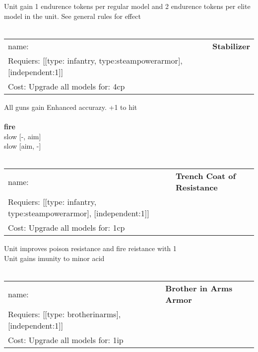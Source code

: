 Unit gain 1 endurence tokens per regular model  and 2 endurence tokens per elite model in the unit. See general rules for effect\\ 









\ \\
\begin{tabular}{ll}
name: & {\bf Stabilizer } \\
Requiers: [[type: infantry, type:steampowerarmor], [independent:1]] \\
Cost: Upgrade all models for: 4cp \\
\end{tabular}

All guns gain Enhanced accurazy. +1 to hit\\ 








\ \\ {\bf fire } \\
slow [-, aim] \\
slow [aim, -] \\

\ \\
\begin{tabular}{ll}
name: & {\bf Trench Coat of Resistance } \\
Requiers: [[type: infantry, type:steampowerarmor], [independent:1]] \\
Cost: Upgrade all models for: 1cp \\
\end{tabular}

Unit improves poison resistance and fire reistance with 1\\ 
Unit gains imunity to minor acid\\ 









\ \\
\begin{tabular}{ll}
name: & {\bf Brother in Arms Armor } \\
Requiers: [[type: brotherinarms], [independent:1]] \\
Cost: Upgrade all models for: 1ip \\
\end{tabular}

